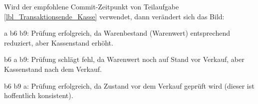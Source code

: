 \begin{enumerate}[a)]
\begin{solution}
		Wird der empfohlene Commit-Zeitpunkt von Teilaufgabe \ref{lbl_Transaktionsende_Kasse} verwendet, dann verändert sich das Bild:

		a b6 b9: Prüfung erfolgreich, da Warenbestand (Warenwert) entsprechend reduziert, aber Kassenstand erhöht.

		b6 a b9: Prüfung schlägt fehl, da Warenwert noch auf Stand vor Verkauf, aber Kassenstand nach dem Verkauf.

		b6 b9 a: Prüfung erfolgreich, da Zustand vor dem Verkauf geprüft wird (dieser ist hoffentlich konsistent).
		\end{solution}

	\end{enumerate}
